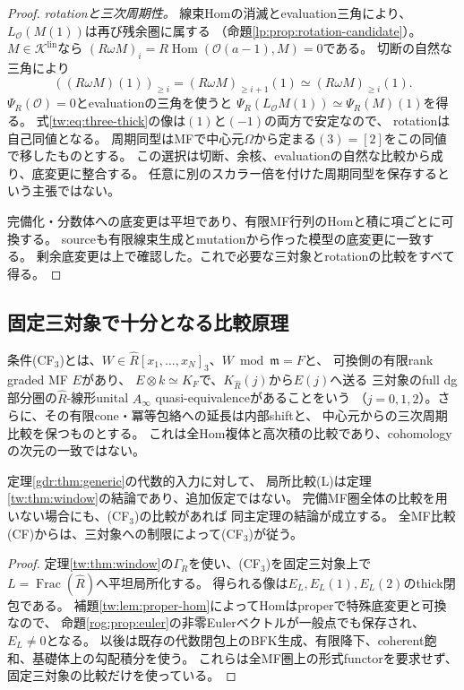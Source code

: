\begin{proof}
\emph{rotationと三次周期性。}
線束Homの消滅とevaluation三角により、$L_{\mathcal O}(M(1))$は再び残余圏に属する
（命題\ref{lp:prop:rotation-candidate}）。
$M\in\mathcal K^{\mathrm{lin}}$なら
$(R\omega M)_i=R\operatorname{Hom}(\mathcal O(a-1),M)=0$である。
切断の自然な三角により
\begin{equation}\label{tw:eq:rotation-cut}
 ((R\omega M)(1))_{\ge i}
 =(R\omega M)_{\ge i+1}(1)
 \simeq(R\omega M)_{\ge i}(1).
\end{equation}
$\Psi_R(\mathcal O)=0$とevaluationの三角を使うと
$\Psi_R(L_{\mathcal O}M(1))\simeq\Psi_R(M)(1)$を得る。
式\eqref{tw:eq:three-thick}の像は$(1)$と$(-1)$の両方で安定なので、
rotationは自己同値となる。
周期同型はMFで中心元$\Omega$から定まる$(3)=[2]$をこの同値で移したものとする。
この選択は切断、余核、evaluationの自然な比較から成り、底変更に整合する。
任意に別のスカラー倍を付けた周期同型を保存するという主張ではない。

完備化・分数体への底変更は平坦であり、有限MF行列のHomと積に項ごとに可換する。
sourceも有限線束生成とmutationから作った模型の底変更に一致する。
剰余底変更は上で確認した。これで必要な三対象とrotationの比較をすべて得る。
\end{proof}

\subsection{固定三対象で十分となる比較原理}

\begin{definition}[固定三対象の形式的比較]\label{tw:def:CF3}
条件\textup{(CF$_3$)}とは、$W\in\widehat R[x_1,\ldots,x_N]_3$、$W\bmod\mathfrak m=F$と、
可換側の有限rank graded MF $E$があり、
$E\otimes k\simeq K_F$で、$K_{\widehat R}(j)$から$E(j)$へ送る
三対象のfull dg部分圏の$\widehat R$-線形unital $A_\infty$ quasi-equivalenceがあることをいう
（$j=0,1,2$）。さらに、その有限cone・冪等包絡への延長は内部shiftと、
中心元からの三次周期比較を保つものとする。
これは全Hom複体と高次積の比較であり、cohomologyの次元の一致ではない。
\end{definition}

\begin{corollary}[固定三対象の比較による復元]\label{tw:cor:CF3}
定理\ref{gdr:thm:generic}の代数的入力に対して、
局所比較(L)は定理\ref{tw:thm:window}の結論であり、追加仮定ではない。
完備MF圏全体の比較を用いない場合にも、\textup{(CF$_3$)}の比較があれば
同主定理の結論が成立する。
全MF比較\textup{(CF)}からは、三対象への制限によって\textup{(CF$_3$)}が従う。
\end{corollary}
\begin{proof}
定理\ref{tw:thm:window}の$\Gamma_R$を使い、\textup{(CF$_3$)}を固定三対象上で
$L=\operatorname{Frac}(\widehat R)$へ平坦局所化する。
得られる像は$E_L,E_L(1),E_L(2)$のthick閉包である。
補題\ref{tw:lem:proper-hom}によってHomはproperで特殊底変更と可換なので、
命題\ref{rog:prop:euler}の非零Eulerベクトルが一般点でも保存され、$E_L\ne0$となる。
以後は既存の代数閉包上のBFK生成、有限降下、coherent飽和、基礎体上の勾配積分を使う。
これらは全MF圏上の形式functorを要求せず、固定三対象の比較だけを使っている。
\end{proof}


